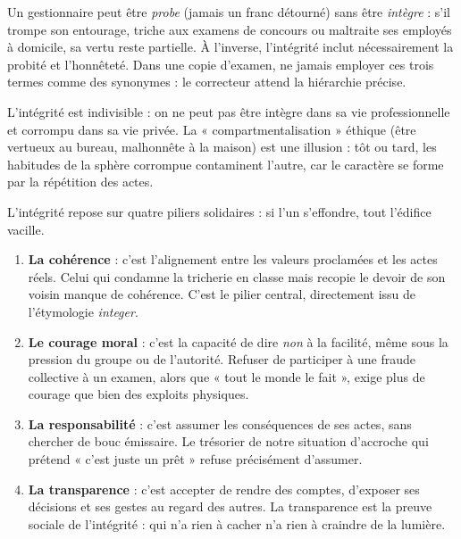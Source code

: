 \documentclass[11pt]{article}
\newcommand{\cle}[1]{{\popxbold\color{popdark}#1}}
\newcounter{popsec}
\newcounter{popsub}
\newcommand{\courssub}[1]{%
  \stepcounter{popsub}%
  \par\vspace{9pt}\noindent{\popxbold\fontsize{11.5}{13}\selectfont\color{popink}{\color{poporange}\thepopsec.\thepopsub}\hspace{6pt}#1}\par\nopagebreak\vspace{4pt}
}
\begin{document}
\begin{attention}
Un gestionnaire peut être \emph{probe} (jamais un franc détourné) sans être \emph{intègre} : s'il trompe son entourage, triche aux examens de concours ou maltraite ses employés à domicile, sa vertu reste partielle. À l'inverse, l'intégrité inclut nécessairement la probité et l'honnêteté. Dans une copie d'examen, ne jamais employer ces trois termes comme des synonymes : le correcteur attend la hiérarchie précise.
\end{attention}

\begin{propriete}
L'intégrité est \cle{indivisible} : on ne peut pas être intègre dans sa vie professionnelle et corrompu dans sa vie privée. La « compartmentalisation » éthique (être vertueux au bureau, malhonnête à la maison) est une illusion : tôt ou tard, les habitudes de la sphère corrompue contaminent l'autre, car le caractère se forme par la répétition des actes.
\end{propriete}

\courssub{Les quatre piliers de l'intégrité}

L'intégrité repose sur quatre piliers solidaires : si l'un s'effondre, tout l'édifice vacille.

\begin{enumerate}
\item \textbf{La \cle{cohérence}} : c'est l'alignement entre les valeurs proclamées et les actes réels. Celui qui condamne la tricherie en classe mais recopie le devoir de son voisin manque de cohérence. C'est le pilier central, directement issu de l'étymologie \emph{integer}.
\item \textbf{Le \cle{courage moral}} : c'est la capacité de dire \emph{non} à la facilité, même sous la pression du groupe ou de l'autorité. Refuser de participer à une fraude collective à un examen, alors que « tout le monde le fait », exige plus de courage que bien des exploits physiques.
\item \textbf{La \cle{responsabilité}} : c'est assumer les conséquences de ses actes, sans chercher de bouc émissaire. Le trésorier de notre situation d'accroche qui prétend « c'est juste un prêt » refuse précisément d'assumer.
\item \textbf{La \cle{transparence}} : c'est accepter de rendre des comptes, d'exposer ses décisions et ses gestes au regard des autres. La transparence est la preuve sociale de l'intégrité : qui n'a rien à cacher n'a rien à craindre de la lumière.
\end{enumerate}
\end{document}
